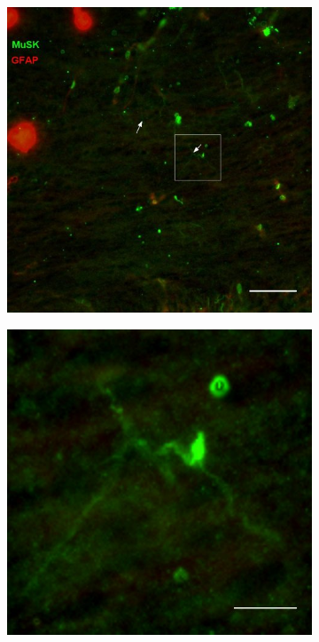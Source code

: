 	\begin{figure}[h]
		\begin{center}
			\begin{subfigure}[h]{0.329\textwidth}
				\caption{}
				\label{fig:MuskE5WT}
				\includegraphics[width=\textwidth]{./Images/Immuno/Musk/Embryon/E5WT_50um_500px_df.jpg} 
			\end{subfigure}
			\begin{subfigure}[h]{0.329\textwidth}
				\caption{}
				\label{fig:MuskE5Marquage}
				\includegraphics[width=\textwidth]{./Images/Immuno/Musk/Embryon/E5_WT_MuSK_500px_Zoom_10um.jpg}

\end{subfigure}
\end{center}
\end{figure}
